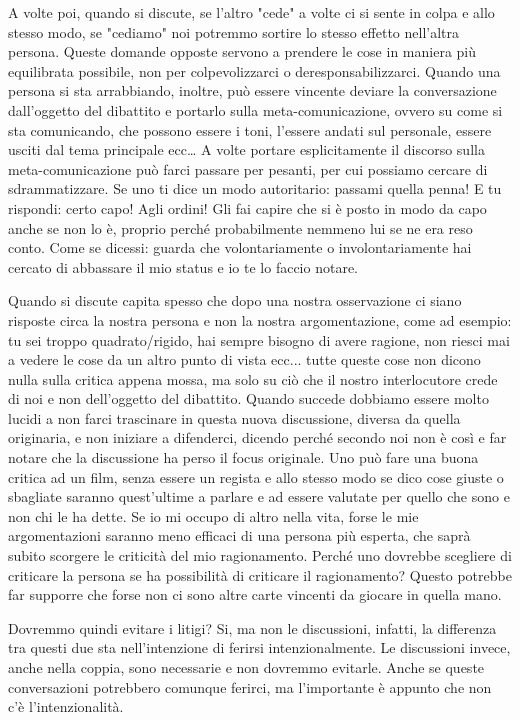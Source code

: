 \documentclass[12pt]{book} %
\begin{document}
A volte poi, quando si discute, se l'altro "cede" a volte ci si sente in colpa e allo stesso modo, se "cediamo" noi potremmo sortire lo stesso effetto nell'altra persona.
Queste domande opposte servono a prendere le cose in maniera più equilibrata possibile, non per colpevolizzarci o deresponsabilizzarci.
Quando una persona si sta arrabbiando, inoltre, può essere vincente deviare la conversazione dall'oggetto del dibattito e portarlo sulla meta-comunicazione, ovvero su come si sta comunicando, che possono essere i toni, l'essere andati sul personale, essere usciti dal tema principale ecc… 
A volte portare esplicitamente il discorso sulla meta-comunicazione può farci passare per pesanti, per cui possiamo cercare di sdrammatizzare. Se uno ti dice un modo autoritario: passami quella penna! E tu rispondi: certo capo! Agli ordini! Gli fai capire che si è posto in modo da capo anche se non lo è, proprio perché probabilmente nemmeno lui se ne era reso conto. Come se dicessi: guarda che volontariamente o involontariamente hai cercato di abbassare il mio status e io te lo faccio notare.

Quando si discute capita spesso che dopo una nostra osservazione ci siano risposte circa la nostra persona e non la nostra argomentazione, come ad esempio: tu sei troppo quadrato/rigido, hai sempre bisogno di avere ragione, non riesci mai a vedere le cose da un altro punto di vista ecc... tutte queste cose non dicono nulla sulla critica appena mossa, ma solo su ciò che il nostro interlocutore crede di noi e non dell'oggetto del dibattito. Quando succede dobbiamo essere molto lucidi a non farci trascinare in questa nuova discussione, diversa da quella originaria, e non iniziare a difenderci, dicendo perché secondo noi non è così e far notare che la discussione ha perso il focus originale. Uno può fare una buona critica ad un film, senza essere un regista e allo stesso modo se dico cose giuste o sbagliate saranno quest'ultime a parlare e ad essere valutate per quello che sono e non chi le ha dette. Se io mi occupo di altro nella vita, forse le mie argomentazioni saranno meno efficaci di una persona più esperta, che saprà subito scorgere le criticità del mio ragionamento. Perché uno dovrebbe scegliere di criticare la persona se ha possibilità di criticare il ragionamento? Questo potrebbe far supporre che forse non ci sono altre carte vincenti da giocare in quella mano.

Dovremmo quindi evitare i litigi? Si, ma non le discussioni, infatti, la differenza tra questi due sta
nell'intenzione di ferirsi intenzionalmente. Le
discussioni invece, anche nella coppia, sono necessarie e non dovremmo evitarle. Anche se queste conversazioni
potrebbero comunque ferirci, ma l'importante è appunto che non c'è l'intenzionalità.
\end{document}
